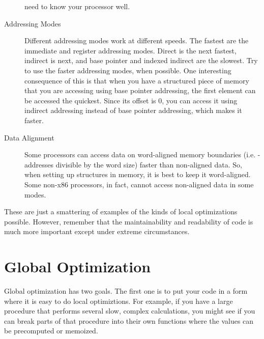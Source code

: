 \begin{description}
need to know your processor well.
\item[Addressing Modes] Different addressing modes work at different speeds.  The fastest are 
the immediate and register addressing modes.  Direct is the next fastest, 
indirect is next, and base pointer and indexed indirect are the slowest.  
Try to use the faster addressing modes, when possible.  One interesting
consequence of this is that when you have a structured piece of memory 
that you are accessing using base pointer addressing, the first element can 
be accessed the quickest.  Since its offset is 0, you can access it using 
indirect addressing instead of base pointer addressing, which makes it 
faster.
\item[Data Alignment] Some processors can access data on word-aligned memory boundaries 
(i.e. - addresses divisible by the word size) faster than non-aligned data.  
So, when setting up structures in memory, it is best to keep it word-aligned.  
Some non-x86 processors, in fact, cannot access non-aligned data in some modes.
\end{description}

These are just a smattering of examples of the kinds of local optimizations 
possible.  However, remember that the maintainability and readability of 
code is much more important except under extreme circumstances.

\section{Global Optimization}

Global optimization has two goals.  The first one is to put your code
in a form where it is easy to do local optimiztions.  For example, 
if you have a large procedure that 
performs several slow, complex calculations, you might see if you can break
parts of that procedure into their own functions where the
values can be precomputed or memoized. 

